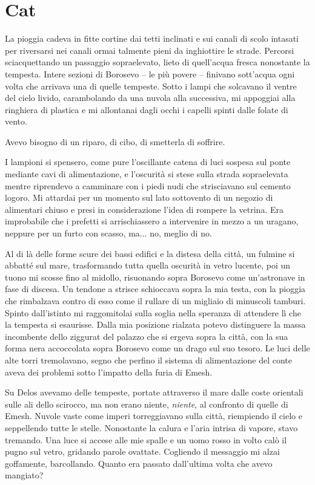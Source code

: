 \chapter{Cat}

La pioggia cadeva in fitte cortine dai tetti inclinati e sui canali di
scolo intasati per riversarsi nei canali ormai talmente pieni da
inghiottire le strade. Percorsi sciacquettando un passaggio
sopraelevato, lieto di quell'acqua fresca nonostante la tempesta. Intere
sezioni di Borosevo -- le più povere -- finivano sott'acqua ogni volta
che arrivava una di quelle tempeste. Sotto i lampi che solcavano il
ventre del cielo livido, carambolando da una nuvola alla successiva, mi
appoggiai alla ringhiera di plastica e mi allontanai dagli occhi i
capelli spinti dalle folate di vento.

Avevo bisogno di un riparo, di cibo, di smetterla di soffrire.

I lampioni si spensero, come pure l'oscillante catena di luci sospesa
sul ponte mediante cavi di alimentazione, e l'oscurità si stese sulla
strada sopraelevata mentre riprendevo a camminare con i piedi nudi che
strisciavano sul cemento logoro. Mi attardai per un momento sul lato
sottovento di un negozio di alimentari chiuso e presi in considerazione
l'idea di rompere la vetrina. Era improbabile che i prefetti si
arrischiassero a intervenire in mezzo a un uragano, neppure per un furto
con scasso, ma... no, meglio di no.

Al di là delle forme scure dei bassi edifici e la distesa della città,
un fulmine si abbatté sul mare, trasformando tutta quella oscurità in
vetro lucente, poi un tuono mi scosse fino al midollo, risuonando sopra
Borosevo come un'astronave in fase di discesa. Un tendone a strisce
schioccava sopra la mia testa, con la pioggia che rimbalzava contro di
esso come il rullare di un migliaio di minuscoli tamburi. Spinto
dall'istinto mi raggomitolai sulla soglia nella speranza di {attendere}
lì che la tempesta si esaurisse. Dalla mia posizione rialzata potevo
distinguere la massa incombente dello ziggurat del palazzo che si ergeva
sopra la città, con la sua forma nera accoccolata sopra Borosevo come un
drago sul suo tesoro. Le luci delle alte torri tremolavano, segno che
perfino il sistema di alimentazione del conte aveva dei problemi sotto
l'impatto della furia di Emesh.

Su Delos avevamo delle tempeste, portate attraverso il mare dalle coste
orientali sulle ali dello scirocco, ma non erano niente, \emph{niente},
al confronto di quelle di Emesh. Nuvole vaste come imperi torreggiavano
sulla città, riempiendo il cielo e seppellendo tutte le stelle.
Nonostante la calura e l'aria intrisa di vapore, stavo tremando. Una
luce si accese alle mie spalle e un uomo rosso in volto calò il pugno
sul vetro, gridando parole ovattate. Cogliendo il messaggio mi alzai
goffamente, barcollando. Quanto era passato dall'ultima volta che avevo
mangiato?

